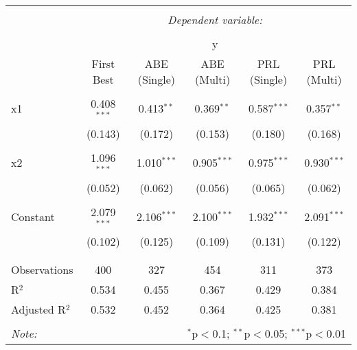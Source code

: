 
\begin{tabular}{@{\extracolsep{5pt}}lccccc} 
\\[-1.8ex]\hline 
\hline \\[-1.8ex] 
 & \multicolumn{5}{c}{\textit{Dependent variable:}} \\ 
\cline{2-6} 
\\[-1.8ex] & \multicolumn{5}{c}{y} \\ 
 & First Best & ABE (Single) & ABE (Multi) & PRL (Single) & PRL (Multi) \\ 
\hline \\[-1.8ex] 
 x1 & 0.408$^{***}$ & 0.413$^{**}$ & 0.369$^{**}$ & 0.587$^{***}$ & 0.357$^{**}$ \\ 
  & (0.143) & (0.172) & (0.153) & (0.180) & (0.168) \\ 
  & & & & & \\ 
 x2 & 1.096$^{***}$ & 1.010$^{***}$ & 0.905$^{***}$ & 0.975$^{***}$ & 0.930$^{***}$ \\ 
  & (0.052) & (0.062) & (0.056) & (0.065) & (0.062) \\ 
  & & & & & \\ 
 Constant & 2.079$^{***}$ & 2.106$^{***}$ & 2.100$^{***}$ & 1.932$^{***}$ & 2.091$^{***}$ \\ 
  & (0.102) & (0.125) & (0.109) & (0.131) & (0.122) \\ 
  & & & & & \\ 
\hline \\[-1.8ex] 
Observations & 400 & 327 & 454 & 311 & 373 \\ 
R$^{2}$ & 0.534 & 0.455 & 0.367 & 0.429 & 0.384 \\ 
Adjusted R$^{2}$ & 0.532 & 0.452 & 0.364 & 0.425 & 0.381 \\ 
\hline 
\hline \\[-1.8ex] 
\textit{Note:}  & \multicolumn{5}{r}{$^{*}$p$<$0.1; $^{**}$p$<$0.05; $^{***}$p$<$0.01} \\ 
\end{tabular} 
